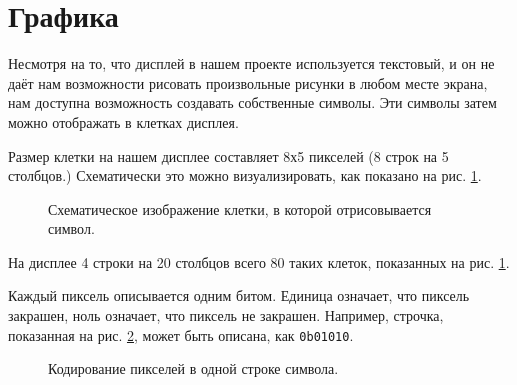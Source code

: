 \documentclass[../sparc.tex]{subfiles}
\begin{document}
\section{Графика}

Несмотря на то, что дисплей в нашем проекте используется текстовый, и он не даёт
нам возможности рисовать произвольные рисунки в любом месте экрана, нам доступна
возможность создавать собственные символы.  Эти символы затем можно отображать в
клетках дисплея.

Размер клетки на нашем дисплее составляет 8х5 пикселей (8 строк на 5 столбцов.)
Схематически это можно визуализировать, как показано на
рис. \ref{fig:game-dev-char}.

\begin{figure}[ht]
  \centering
  \caption{Схематическое изображение клетки, в которой отрисовывается символ.}
  \label{fig:game-dev-char}
\end{figure}

На дисплее 4 строки на 20 столбцов всего 80 таких клеток, показанных на рис.
\ref{fig:game-dev-char}.

Каждый пиксель описывается одним битом. Единица означает, что пиксель закрашен,
ноль означает, что пиксель не закрашен. Например, строчка, показанная на рис.
\ref{fig:game-dev-char-symbol-encoding}, может быть описана, как
\texttt{0b01010}.


\begin{figure}[ht]
  \centering
  \caption{Кодирование пикселей в одной строке символа.}
  \label{fig:game-dev-char-symbol-encoding}
\end{figure}
\end{document}
